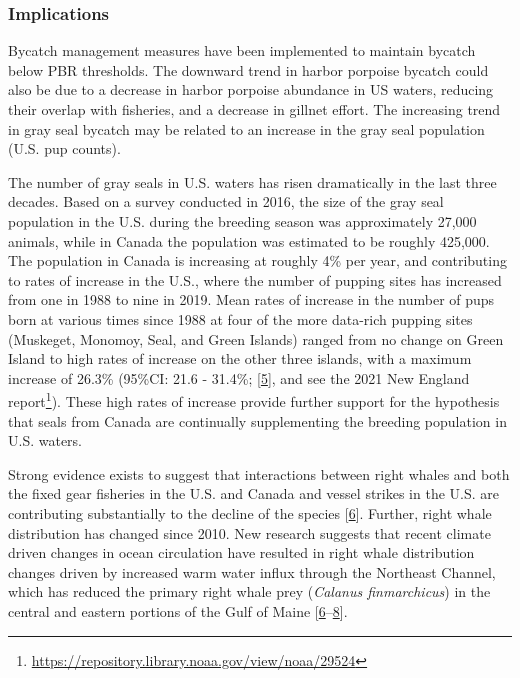 \documentclass[
  10pt,
]{article}
\begin{document}
\hypertarget{implications-5}{%
\subsubsection{Implications}\label{implications-5}}

Bycatch management measures have been implemented to maintain bycatch
below PBR thresholds. The downward trend in harbor porpoise bycatch
could also be due to a decrease in harbor porpoise abundance in US
waters, reducing their overlap with fisheries, and a decrease in gillnet
effort. The increasing trend in gray seal bycatch may be related to an
increase in the gray seal population (U.S. pup counts).

The number of gray seals in U.S. waters has risen dramatically in the
last three decades. Based on a survey conducted in 2016, the size of the
gray seal population in the U.S. during the breeding season was
approximately 27,000 animals, while in Canada the population was
estimated to be roughly 425,000. The population in Canada is increasing
at roughly 4\% per year, and contributing to rates of increase in the
U.S., where the number of pupping sites has increased from one in 1988
to nine in 2019. Mean rates of increase in the number of pups born at
various times since 1988 at four of the more data-rich pupping sites
(Muskeget, Monomoy, Seal, and Green Islands) ranged from no change on
Green Island to high rates of increase on the other three islands, with
a maximum increase of 26.3\% (95\%CI: 21.6 - 31.4\%;
{[}\protect\hyperlink{ref-wood_rates_2020}{5}{]}, and see the 2021 New
England report\footnote{\url{https://repository.library.noaa.gov/view/noaa/29524}}).
These high rates of increase provide further support for the hypothesis
that seals from Canada are continually supplementing the breeding
population in U.S. waters.

Strong evidence exists to suggest that interactions between right whales
and both the fixed gear fisheries in the U.S. and Canada and vessel
strikes in the U.S. are contributing substantially to the decline of the
species {[}\protect\hyperlink{ref-hayes_north_2018}{6}{]}. Further,
right whale distribution has changed since 2010. New research suggests
that recent climate driven changes in ocean circulation have resulted in
right whale distribution changes driven by increased warm water influx
through the Northeast Channel, which has reduced the primary right whale
prey (\emph{Calanus finmarchicus}) in the central and eastern portions
of the Gulf of Maine
{[}\protect\hyperlink{ref-hayes_north_2018}{6}--\protect\hyperlink{ref-sorochan_north_2019}{8}{]}.
\end{document}
